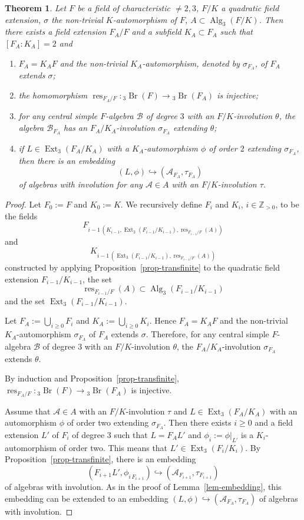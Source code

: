 \documentclass[10pt]{article}
\newtheorem{theorem}{Theorem}[section]
\theoremstyle{definition}
\DeclareMathOperator{\Br}{Br}
\DeclareMathOperator{\res}{res}
\DeclareMathOperator{\Alg}{Alg}
\DeclareMathOperator{\Ext}{Ext}
\newcommand{\A}{\mathcal A}
\newcommand{\B}{\mathcal B}
\newcommand{\bthree}[1]{{}_3\Br(#1)}
\begin{document}
\begin{theorem}\label{thm-exhaust}
Let $F$ be a field of characteristic $\neq2,3$, $F/K$ a quadratic field extension, $\sigma$ the non-trivial $K$-automorphism of $F$, $A\subset\Alg_3(F/K)$. Then there exists a field extension $F_A/F$ and a subfield $K_A\subset F_A$ such that $[F_A:K_A]=2$ and
\begin{enumerate}
\item $F_A=K_AF$ and the non-trivial $K_A$-automorphism, denoted by $\sigma_{F_A}$, of $F_A$ extends $\sigma$;
\item the homomorphism $\res_{F_A/F}:\bthree F\to\bthree{F_A}$ is injective;
\item for any central simple $F$-algebra $\B$ of degree $3$ with an $F/K$-involution $\theta$, the algebra $\B_{F_A}$ has an $F_A/K_A$-involution $\sigma_{F_A}$ extending $\theta$;
\item if $L\in\Ext_3(F_A/K_A)$ with a $K_A$-automorphism $\phi$ of order $2$ extending $\sigma_{F_A}$, then there is an embedding
\[
(L,\phi)\hookrightarrow(\A_{F_A},\tau_{F_A})
\]
of algebras with involution for any $\A\in A$ with an $F/K$-involution $\tau$.
\end{enumerate}
\end{theorem}
\begin{proof}
Let $F_0:=F$ and $K_0:=K$. We recursively define $F_i$ and $K_i$, $i\in\mathbb Z_{>0}$, to be the fields
\[
F_{i-1\,(K_{i-1},\Ext_3(F_{i-1}/K_{i-1}),\res_{F_{i-1}/F}(A))}
\]
and
\[
K_{i-1\,(\Ext_3(F_{i-1}/K_{i-1}),\res_{F_{i-1}/F}(A))}
\]
constructed by applying Proposition~\ref{prop-transfinite} to the quadratic field extension $F_{i-1}/K_{i-1}$, the set
\[
\res_{F_{i-1}/F}(A)\subset\Alg_3(F_{i-1}/K_{i-1})
\]
and the set $\Ext_3(F_{i-1}/K_{i-1})$.

Let $F_A:=\bigcup_{i\geq0}F_i$ and $K_A:=\bigcup_{i\geq0}K_i$. Hence $F_A=K_AF$ and the non-trivial $K_A$-automorphism $\sigma_{F_A}$ of $F_A$ extends $\sigma$. Therefore, for any central simple $F$-algebra $\B$ of degree $3$ with an $F/K$-involution $\theta$, the $F_A/K_A$-involution $\sigma_{F_A}$ extends $\theta$.

By induction and Proposition~\ref{prop-transfinite}, $\res_{F_A/F}:\bthree F\to\bthree{F_A}$ is injective.

Assume that $\A\in A$ with an $F/K$-involution $\tau$ and $L\in\Ext_3(F_A/K_A)$ with an automorphism $\phi$ of order two extending $\sigma_{F_A}$. Then there exists $i\geq0$ and a field extension $L'$ of $F_i$ of degree $3$ such that $L=F_AL'$ and $\phi_i:=\phi|_{L'}$ is a $K_i$-automorphism of order two. This means that $L'\in\Ext_3(F_i/K_i)$. By Proposition~\ref{prop-transfinite}, there is an embedding
\[
(F_{i+1}L',\phi_{i\,F_{i+1}})\hookrightarrow(\A_{F_{i+1}},\tau_{F_{i+1}})
\]
of algebras with involution. As in the proof of Lemma~\ref{lem-embedding}, this embedding can be extended to an embedding $(L,\phi)\hookrightarrow(\A_{F_A},\tau_{F_A})$ of algebras with involution.
\end{proof}
\end{document}
